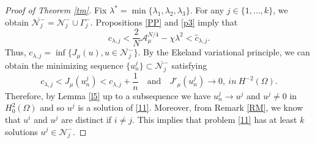 \documentclass[reqno]{amsart}
\begin{document}
\begin{proof}[Proof of Theorem \ref{tm}]
 Fix $\lambda^*=\min\{\lambda_1, \lambda_2, \lambda_3\}$.
For any $j\in \{1,\dots,k\}$, we obtain 
$\overline{\mathcal{N}_j^-}=\mathcal{N}_j^-\cup \Gamma_j^-$. 
Propositions \ref{PP} and \ref{p3} imply that
$$
 c_{\lambda, j}<\frac{2}{N}\mathcal{A}_{\mu}^{N/4}-\chi \lambda^2< \hat{c}_{\lambda, j}.
$$
Thus, $c_{\lambda, j}=\inf \{J_{\mu}(u), u\in \overline{\mathcal{N}_j^-}\}$. 
By the Ekeland variational principle, we can obtain the minimizing sequence 
$\{u_n^j\}\subset \overline{\mathcal{N}_j^-}$ satisfying
 $$
 c_{\lambda, j} <J_{\mu}(u_n^j)<c_{\lambda, j}+\frac{1}{n}\quad\text{and}\quad
 J'_{\mu}(u_n^j)\to 0, \ in \ H^{-2}(\Omega).
 $$
Therefore, by Lemma \ref{l5} up to a subsequence we have $u_n^j\to u^j$ and $u^j\neq 0$ 
in $H^2_0(\Omega)$ and so $u^j$ is a solution of \eqref{11}.
Moreover, from Remark \ref{RM}, we know that $u^i$ and $u^j$ are distinct if 
$i\neq j.$ This implies that problem \eqref{11} has at least $k$ solutions 
$u^j\in \mathcal{N}_j^-$.
\end{proof}
\end{document}
